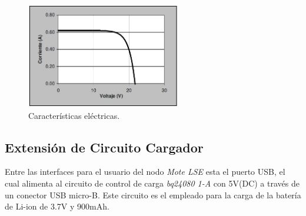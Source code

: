 {%


\begin{figure}[h!]
	\centering
    \includegraphics[width=0.6\textwidth]{./Figures/curva.JPG}
    	\caption{Características eléctricas.}
	\label{fig:curva}
\end{figure}

\subsection{Extensión de Circuito Cargador}
\label{subsec:extensión}
Entre las interfaces para el usuario del nodo \textit{Mote LSE} esta el puerto USB, el cual alimenta al circuito de control de carga \textit{bq24080 1-A} con 5V(DC) a través de un conector USB micro-B. Este circuito es el empleado para la carga de la batería de Li-ion de 3.7V y 900mAh.

}
